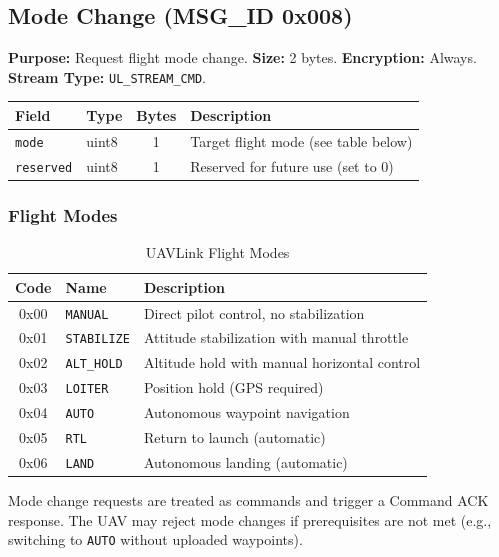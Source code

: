 \documentclass[11pt,a4paper]{article}
\begin{document}
\subsection{Mode Change (MSG\_ID 0x008)}

\textbf{Purpose:} Request flight mode change. \textbf{Size:} 2 bytes. \textbf{Encryption:} Always. \textbf{Stream Type:} \texttt{UL\_STREAM\_CMD}.

\begin{table}[H]
\centering
\begin{tabular}{@{}llcl@{}}
\toprule
\textbf{Field} & \textbf{Type} & \textbf{Bytes} & \textbf{Description} \\
\midrule
\texttt{mode}     & uint8 & 1 & Target flight mode (see table below) \\
\texttt{reserved} & uint8 & 1 & Reserved for future use (set to 0) \\
\bottomrule
\end{tabular}
\end{table}

\subsubsection{Flight Modes}

\begin{table}[H]
\centering
\caption{UAVLink Flight Modes}
\begin{tabular}{@{}clp{8cm}@{}}
\toprule
\textbf{Code} & \textbf{Name} & \textbf{Description} \\
\midrule
0x00 & \texttt{MANUAL}    & Direct pilot control, no stabilization \\
0x01 & \texttt{STABILIZE} & Attitude stabilization with manual throttle \\
0x02 & \texttt{ALT\_HOLD}  & Altitude hold with manual horizontal control \\
0x03 & \texttt{LOITER}    & Position hold (GPS required) \\
0x04 & \texttt{AUTO}      & Autonomous waypoint navigation \\
0x05 & \texttt{RTL}       & Return to launch (automatic) \\
0x06 & \texttt{LAND}      & Autonomous landing (automatic) \\
\bottomrule
\end{tabular}
\end{table}

\begin{notebox}
Mode change requests are treated as commands and trigger a Command ACK response. The UAV may reject mode changes if prerequisites are not met (e.g., switching to \texttt{AUTO} without uploaded waypoints).
\end{notebox}
\end{document}
